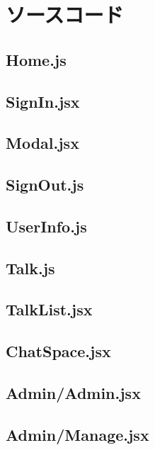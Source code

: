 \chapter{ソースコード}

\section{Home.js}
{\tiny }

\section{SignIn.jsx}
{\tiny }

\section{Modal.jsx}
{\tiny }

\section{SignOut.js}
{\tiny }

\section{UserInfo.js}
{\tiny }

\section{Talk.js}
{\tiny }

\section{TalkList.jsx}
{\tiny }

\section{ChatSpace.jsx}
{\tiny }

\section{Admin/Admin.jsx}
{\tiny }

\section{Admin/Manage.jsx}
{\tiny }

